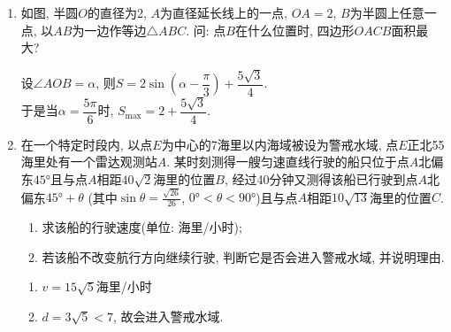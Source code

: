 \begin{enumerate}
\item 如图, 半圆$O$的直径为2, $A$为直径延长线上的一点, $OA=2$, $B$为半圆上任意一点, 以$AB$为一边作等边$\triangle{ABC}$. 
问: 点$B$在什么位置时, 四边形$OACB$面积最大? 
\begin{jieda}
设$\angle{AOB}=\alpha$, 则$S=2\sin\left(\alpha-\dfrac{\pi}{3}\right)+\dfrac{5\sqrt{3}}{4}$. \\
于是当$\alpha=\dfrac{5\pi}{6}$时, $S_{\max}=2+\dfrac{5\sqrt{3}}{4}$. 
\end{jieda}

\item 在一个特定时段内, 以点$E$为中心的7海里以内海域被设为警戒水域, 点$E$正北55海里处有一个雷达观测站$A$. 
某时刻测得一艘匀速直线行驶的船只位于点$A$北偏东$\ang{45}$且与点$A$相距$40\sqrt{2}$海里的位置$B$, 经过40分钟又测得该船已行驶到点$A$北偏东$\ang{45}+\theta$
(其中$\sin\theta=\frac{\sqrt{26}}{26}$, $\ang{0}<\theta<\ang{90}$)且与点$A$相距$10\sqrt{13}$海里的位置$C$. 
\begin{enumerate}
\item 求该船的行驶速度(单位: 海里/小时); 
\item 若该船不改变航行方向继续行驶, 判断它是否会进入警戒水域, 并说明理由. 
\end{enumerate}
\begin{jieda}
\begin{enumerate}
\item $v=15\sqrt{5}$海里/小时

\item $d=3\sqrt{5}<7$, 故会进入警戒水域. 
\end{enumerate}
\end{jieda}

\end{enumerate}

